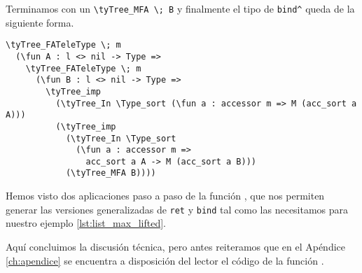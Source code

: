\begin{enumerate}
    Terminamos con un \lstinline{\tyTree_MFA \; B} y finalmente el tipo de \lstinline{bind^} queda de la siguiente forma.
    \begin{lstlisting}
\tyTree_FATeleType \; m
  (\fun A : l <> nil -> Type =>
    \tyTree_FATeleType \; m
      (\fun B : l <> nil -> Type =>
        \tyTree_imp
          (\tyTree_In \Type_sort (\fun a : accessor m => M (acc_sort a A)))
          (\tyTree_imp
            (\tyTree_In \Type_sort
              (\fun a : accessor m =>
                acc_sort a A -> M (acc_sort a B))) 
            (\tyTree_MFA B))))
    \end{lstlisting}
\end{enumerate}

Hemos visto dos aplicaciones paso a paso de la función \lift, que nos permiten generar las versiones generalizadas de \lstinline{ret} y \lstinline{bind} tal como las necesitamos para nuestro ejemplo \ref{lst:list_max_lifted}.

Aquí concluimos la discusión técnica, pero antes reiteramos que en el Apéndice \ref{ch:apendice} se encuentra a disposición del lector el código de la función \lift.